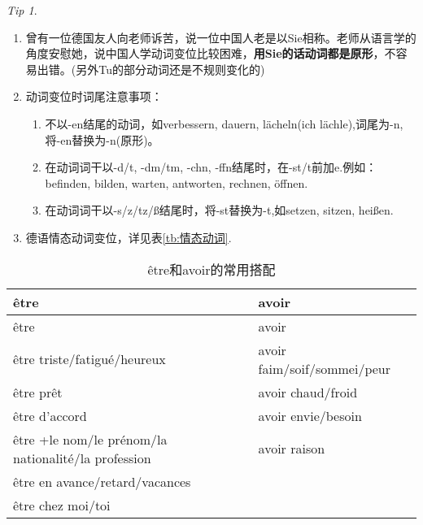 \documentclass[12pt,A4paper,oneside,reqno]{amsart}
\numberwithin{equation}{section}
\theoremstyle{plain}
\theoremstyle{plain}
\theoremstyle{plain}
\numberwithin{equation}{section}
\theoremstyle{remark}
\newtheorem{tip}[theorem]{Tip}
\begin{document}
\begin{tip}\
	\begin{enumerate}[1.]
		\item 	曾有一位德国友人向老师诉苦，说一位中国人老是以Sie相称。老师从语言学的角度安慰她，说中国人学动词变位比较困难，\textbf{用Sie的话动词都是原形}，不容易出错。(另外Tu的部分动词还是不规则变化的)
		\item 动词变位时词尾注意事项：
		\begin{enumerate}
			\item 不以-en结尾的动词，如verbessern, dauern, l\"{a}cheln(ich l\"{a}chle),词尾为-n,将-en替换为-n(原形)。
			\item 在动词词干以-d/t, -dm/tm, -chn, -ffn结尾时，在-st/t前加e.例如：befinden, bilden, warten, antworten, rechnen, \"{o}ffnen.
			\item 在动词词干以-s/z/tz/\ss 结尾时，将-st替换为-t,如setzen, sitzen, hei\ss en.
		\end{enumerate}
		\item  	德语情态动词变位，详见表\ref{tb:情态动词}.
	\end{enumerate}
\end{tip}
	\begin{longtable}{|l|l|}
	\hline
	\^{e}tre	&	avoir		\\
	\hline
	\endhead
	\hline
	\^{e}tre	&	avoir		\\
	\hline
	\endfirsthead	
	\hline
	\endfoot
	\hline		
	\caption{\^{e}tre和avoir的常用搭配}
	\endlastfoot				
\^{e}tre triste/fatigu\'{e}/heureux	&	avoir faim/soif/sommei/peur	\\
\^{e}tre pr\^{e}t	&	avoir chaud/froid	\\
\^{e}tre d'accord	&	avoir envie/besoin	\\
\^{e}tre +le nom/le pr\'{e}nom/la nationalit\'{e}/la profession	&	avoir raison	\\
\^{e}tre en avance/retard/vacances	&		\\
\^{e}tre chez moi/toi	&		\\


\end{longtable}
\end{document}
